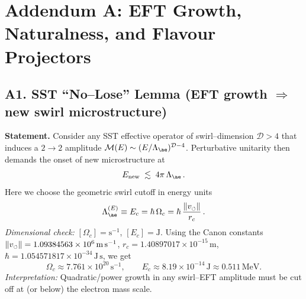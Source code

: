 \documentclass[11pt]{article}
\begin{document}
  \titlepageOpen

  \begin{abstract}


  \end{abstract}

  \titlepageClose
  \fi

  \ifdefined\standalonechapter
  \section{\papertitle}
  \else
  \fi


  \section*{Addendum A: EFT Growth, Naturalness, and Flavour Projectors}

      \subsection*{A1. SST ``No–Lose'' Lemma (EFT growth $\Rightarrow$ new swirl microstructure)}
          \textbf{Statement.} Consider any SST effective operator of swirl–dimension $\mathcal D>4$ that induces a $2\!\to\!2$ amplitude
          $\mathcal M(E)\sim (E/\Lambda_{\ae})^{\mathcal D-4}$. Perturbative unitarity then demands the onset of new microstructure at
          \[
              E_{\text{new}} \;\lesssim\; 4\pi\, \Lambda_{\ae}\, .
          \]
          Here we choose the geometric swirl cutoff in energy units
          \[
              \Lambda_{\ae}^{(E)} \equiv E_c
              = \hbar\,\Omega_c
              = \hbar\, \frac{\|\mathbf \mathbf{v}_{\scriptscriptstyle\boldsymbol{\circlearrowleft}}\|}{r_c}\, .
          \]
          \textit{Dimensional check:} $[\Omega_c]=\mathrm{s}^{-1}$,\; $[E_c]=\mathrm{J}$. Using the Canon constants
          $\|\mathbf \mathbf{v}_{\scriptscriptstyle\boldsymbol{\circlearrowleft}}\|=1.09384563\times10^{6}\,\mathrm{m\,s^{-1}}$, $r_c=1.40897017\times10^{-15}\,\mathrm{m}$, $\hbar=1.054571817\times10^{-34}\,\mathrm{J\,s}$, we get
          \[
              \Omega_c\approx7.761\times10^{20}\,\mathrm{s}^{-1},\qquad
              E_c\approx8.19\times10^{-14}\,\mathrm{J}\approx0.511\,\mathrm{MeV}.
          \]
          \textit{Interpretation:} Quadratic/power growth in any swirl–EFT amplitude must be cut off at (or below) the electron mass scale.
\end{document}
